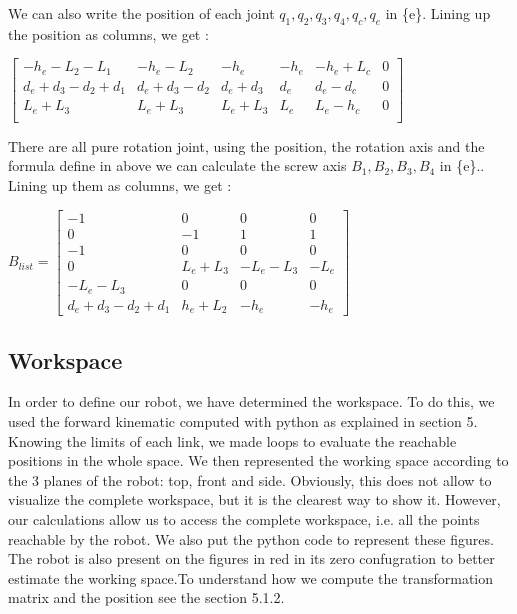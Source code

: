 \bigbreak
We can also write the position of each joint  $q_1,q_2,q_3,q_4,q_c,q_e$ in \{e\}. Lining up the position as columns, we get : 

\begin{center}
    $
    \begin{bmatrix}
        -h_e-L_2-L_1 & -h_e-L_2 & -h_e & -h_e & -h_e+L_c & 0  \\
        d_e+d_3-d_2+d_1 & d_e+d_3-d_2 & d_e+d_3 & d_e & d_e-d_c & 0 \\
        L_e+L_3 & L_e+L_3 & L_e+L_3 & L_e & L_e-h_c & 0 \\
    \end{bmatrix}
    $
\end{center}

\bigbreak
There are all pure rotation joint, using the position, the rotation axis and the formula define in above we can calculate the screw axis $B_1,B_2,B_3,B_4$ in \{e\}.. Lining up them as columns, we get : 

\begin{center}
    $B_{list} = 
    \begin{bmatrix}
        -1 & 0 & 0 & 0 \\
        0 & -1 & 1 & 1 \\
        -1 & 0 & 0 & 0 \\
        0 & L_e+L_3 & -L_e-L_3 & -L_e \\
        -L_e-L_3 & 0 & 0 & 0 \\
        d_e+d_3-d_2+d_1 & h_e+L_2 & -h_e & -h_e
    \end{bmatrix}
    $
\end{center}

\subsection{Workspace}

In order to define our robot, we have determined the workspace. To do this, we used the forward kinematic computed with python as explained in section 5. Knowing the limits of each link, we made loops to evaluate the reachable positions in the whole space. We then represented the working space according to the 3 planes of the robot: top, front and side. Obviously, this does not allow to visualize the complete workspace, but it is the clearest way to show it. However, our calculations allow us to access the complete workspace, i.e. all the points reachable by the robot. We also put the python code to represent these figures. The robot is also present on the figures in red in its zero confugration to better estimate the working space.To understand how we compute the transformation matrix and the position see the section 5.1.2.


